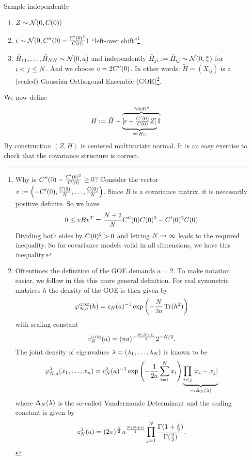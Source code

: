 Sample independently
\begin{enumerate}
	\item \(Z\sim\mathcal{N}(0, C(0))\)
	\item \(\epsilon \sim \mathcal{N}(0, C''(0) - \frac{C'(0)^2}{C(0)})\)
	``left-over shift''\footnote{
		Why is \(C''(0) - \frac{C'(0)^2}{C(0)} \ge 0\)? Consider the
		vector \(v:=\left(-C'(0), \frac{C(0)}{N}, \dots,
		\frac{C(0)}{N}\right)\).  Since \(B\) is a covariance matrix, it
		is necessarily positive definite.
		So we have
		\[
			0 \le v B v^T
			= \frac{N+2}{N}C''(0)C(0)^2 - C'(0)^2C(0)
		\]
		Dividing both sides by \(C(0)^2 > 0\) and letting \(N\to\infty\)
		leads to the required inequality. So for covariance models valid in all
		dimensions, we have this inequality.
	}
	\item \(\tilde{H}_{11},\dots,\tilde{H}_{NN}\sim\mathcal{N}(0,
	a)\) and independently
	\(\tilde{H}_{ji}:=\tilde{H}_{ij}\sim\mathcal{N}(0,\frac{a}{2})\) for
	\(i<j\le N\). And we choose \(a=2C''(0)\).
	In other words: \(\tilde{H} = (X_{ij})\) is a (scaled) Gaussian Orthogonal
	Ensemble (GOE)\footnote{
		Oftentimes the definition of the GOE demands \(a=2\). To make notation
		easier, we follow \textcite{fyodorovHighDimensionalRandomFields2013} in
		this this more general definition.
		For real symmetric matrices \(h\) the density of the GOE is then given by
		\[
			\varphi^{\text{\tiny GOE}}_{N,a}(h)
			= c_N(a)^{-1}\exp\left(-\frac{N}{2a}\operatorname{Tr}(h^2)\right)
		\]
		with scaling constant
		\[
			c^{\text{\tiny GOE}}_N(a)
			= (\pi a)^{-\frac{N(N+1)}{4}}2^{-N/2}.
		\]
		The joint density of eigenvalues
		\(\lambda=(\lambda_1,\dots,\lambda_N)\) is known to be
		\begin{equation}\label{eq: GOE ev density}
			\varphi^{\lambda}_{N, a}(x_1,\dots,x_n)
			= c^\lambda_N(a)^{-1}
			\exp\left(-\frac{1}{2a}\sum_{i=1}^N x_i\right)
			\underbrace{\prod_{i<j}|x_i - x_j|}_{=:\Delta_N(\lambda)}
		\end{equation}
		where \(\Delta_N(\lambda)\) is the so-called Vandermonde Determinant and
		the scaling constant is given by
		\[
			c^\lambda_N(a)
			= (2\pi)^{\frac{N}2}a^{\frac{N(N+1)}4}
			\prod_{j=1}^N \frac{\Gamma(1+\frac{j}2)}{\Gamma(\frac32)}.
		\]
	}.
\end{enumerate}
We now define
\[
	H := \tilde{H}
	+ \overbrace{\underbrace{[\epsilon + \tfrac{C'(0)}{C(0)} Z]}_{=:H_S}\mathbb{I}}^{\text{``shift''}}
\]
By construction \((Z,H)\) is centered multivariate normal. It is an easy
exercise to check that the covariance structure is correct.

